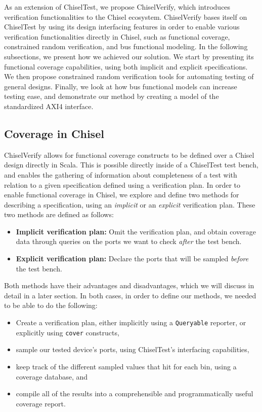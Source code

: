 \documentclass[conference]{IEEEtran}
\begin{document}
As an extension of ChiselTest, we propose ChiselVerify, which introduces verification functionalities to the Chisel ecosystem.
ChiselVerify bases itself on ChiselTest by using its design interfacing features in order to enable various verification functionalities directly in Chisel, such as functional coverage, constrained random verification, and bus functional modeling. 
In the following subsections, we present how we achieved our solution.
We start by presenting its functional coverage capabilities,  using both implicit and explicit specifications.
We then propose constrained random verification tools for automating testing of general designs.
Finally, we look at how bus functional models can increase testing ease, and demonstrate our method by creating a model of the standardized AXI4 interface. 


\subsection{Coverage in Chisel}
ChiselVerify allows for functional coverage constructs to be defined over a Chisel design directly in Scala. 
This is possible directly inside of a ChiselTest test bench, and enables the gathering of information about completeness of a test with relation to a given specification defined using a verification plan.
In order to enable functional coverage in Chisel, we explore and define two methods for describing a specification, using an \emph{implicit} or an \emph{explicit} verification plan.
These two methods are defined as follows:

\begin{itemize}
	\item \textbf{Implicit verification plan:} Omit the verification plan, and obtain coverage data through queries on the ports we want to check \emph{after} the test bench.
	\item \textbf{Explicit verification plan:} Declare the ports that will be sampled \emph{before} the test bench.
\end{itemize}

Both methods have their advantages and disadvantages, which we will discuss in detail in a later section.
In both cases, in order to define our methods, we needed to be able to do the following:

\begin{itemize}
  \item Create a verification plan, either implicitly using a \texttt{Queryable} reporter, or explicitly using \texttt{cover} constructs, 
  \item sample our tested device's ports, using ChiselTest's interfacing capabilities, 
  \item keep track of the different sampled values that hit for each bin, using a coverage database, and 
  \item compile all of the results into a comprehensible and programmatically useful coverage report.
\end{itemize}
\end{document}
